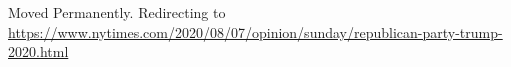 Moved Permanently. Redirecting to
\href{https://www.nytimes.com/2020/08/07/opinion/sunday/republican-party-trump-2020.html}{https://www.nytimes.com/2020/08/07/opinion/sunday/republican-party-trump-2020.html}
